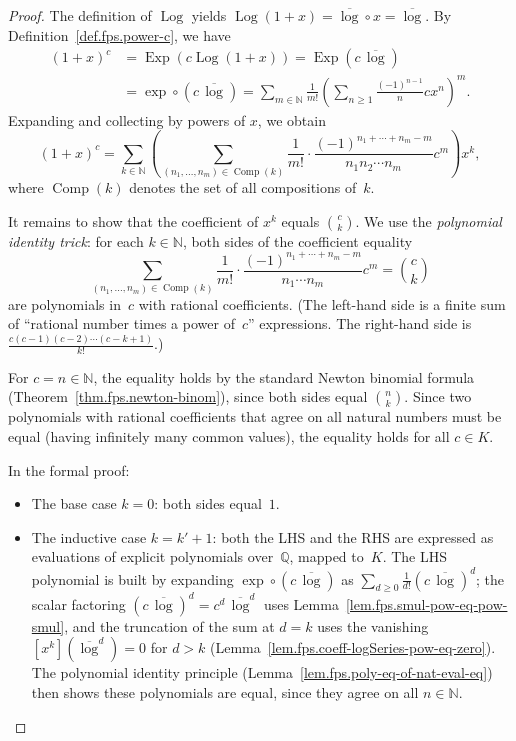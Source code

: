 \begin{proof}
The definition of $\operatorname{Log}$ yields
$\operatorname{Log}(1+x) = \overline{\log}\circ x = \overline{\log}$.
By Definition~\ref{def.fps.power-c}, we have
\begin{align*}
(1+x)^c &= \operatorname{Exp}(c\operatorname{Log}(1+x))
= \operatorname{Exp}(c\,\overline{\log}) \\
&= \exp\circ(c\,\overline{\log})
= \sum_{m\in\mathbb{N}} \frac{1}{m!}\left(\sum_{n\geq 1}\frac{(-1)^{n-1}}{n}cx^n\right)^m.
\end{align*}
Expanding and collecting by powers of $x$, we obtain
\[
(1+x)^c = \sum_{k\in\mathbb{N}} \left(\sum_{(n_1,\ldots,n_m)\in\operatorname{Comp}(k)}
\frac{1}{m!}\cdot\frac{(-1)^{n_1+\cdots+n_m-m}}{n_1 n_2\cdots n_m} c^m\right) x^k,
\]
where $\operatorname{Comp}(k)$ denotes the set of all compositions of~$k$.

It remains to show that the coefficient of $x^k$ equals $\binom{c}{k}$.
We use the \emph{polynomial identity trick}: for each $k\in\mathbb{N}$,
both sides of the coefficient equality
\[
\sum_{(n_1,\ldots,n_m)\in\operatorname{Comp}(k)}
\frac{1}{m!}\cdot\frac{(-1)^{n_1+\cdots+n_m-m}}{n_1\cdots n_m} c^m = \binom{c}{k}
\]
are polynomials in~$c$ with rational coefficients.
(The left-hand side is a finite sum of ``rational number times a power of~$c$''
expressions.
The right-hand side is $\frac{c(c-1)(c-2)\cdots(c-k+1)}{k!}$.)

For $c = n\in\mathbb{N}$, the equality holds by the standard Newton binomial
formula (Theorem~\ref{thm.fps.newton-binom}), since both sides equal $\binom{n}{k}$.
Since two polynomials with rational coefficients that agree on all natural
numbers must be equal (having infinitely many common values), the equality
holds for all $c\in K$.

In the formal proof:
\begin{itemize}
\item The base case $k=0$: both sides equal~$1$.
\item The inductive case $k=k'+1$: both the LHS and the RHS are expressed
as evaluations of explicit polynomials over~$\mathbb{Q}$, mapped to~$K$.
The LHS polynomial is built by expanding $\exp\circ(c\,\overline{\log})$
as $\sum_{d\ge 0}\frac{1}{d!}(c\,\overline{\log})^d$;
the scalar factoring $(c\,\overline{\log})^d = c^d\,\overline{\log}^d$
uses Lemma~\ref{lem.fps.smul-pow-eq-pow-smul},
and the truncation of the sum at $d=k$ uses the vanishing
$[x^k](\overline{\log}^d)=0$ for $d>k$
(Lemma~\ref{lem.fps.coeff-logSeries-pow-eq-zero}).
The polynomial identity principle (Lemma~\ref{lem.fps.poly-eq-of-nat-eval-eq}) then
shows these polynomials are equal, since they agree on all $n\in\mathbb{N}$.
\end{itemize}
\end{proof}

